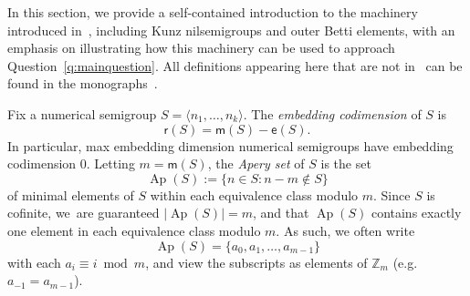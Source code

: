 \documentclass[ALCO]{cedram}
\newcommand\ZZ{\mathbb{Z}}
\DeclareMathOperator\Ap{Ap}
\begin{document}
In this section, we provide a self-contained introduction to the machinery introduced in~\cite{kunzfaces3}, including Kunz nilsemigroups and outer Betti elements, with an emphasis on illustrating how this machinery can be used to approach Question~\ref{q:mainquestion}.  All definitions appearing here that are not in~\cite{kunzfaces3} can be found in the monographs~\cite{numericalappl,numerical}.  

Fix a numerical semigroup $S = \langle n_1, \dots, n_k \rangle$.  
The \emph{embedding codimension} of $S$ is 
$$\mathsf r(S) = \mathsf m(S) - \mathsf e(S).$$
In particular, max embedding dimension numerical semigroups have embedding codimension 0.  
Letting $m = \mathsf m(S)$, the \emph{Apery set} of $S$ is the set
$$\Ap(S) := \{n \in S: n - m \notin S\}$$
of minimal elements of $S$ within each equivalence class modulo $m$.  Since $S$ is cofinite, we~are guaranteed $|\!\Ap(S)| = m$, and that $\Ap(S)$ contains exactly one element in each equivalence class modulo $m$.  As such, we often write
$$\Ap(S) = \{a_0, a_1, \ldots, a_{m-1}\}$$
with each $a_i \equiv i \bmod m$, and view the subscripts as elements of $\ZZ_m$ (e.g. $a_{-1} = a_{m-1}$).  
\end{document}
